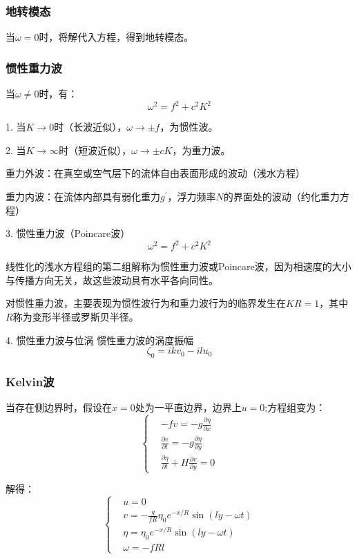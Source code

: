 \documentclass{article}
\begin{document}
\subsubsection{地转模态}
当$\omega=0$时，将解代入方程，得到地转模态。

\subsubsection{惯性重力波}
当$\omega\ne0$时，有：
$$\omega^2 = f^2+c^2K^2$$

1. 当$K \rightarrow 0$时（长波近似），$\omega\rightarrow\pm f$，为惯性波。

2. 当$K \rightarrow \infty$时（短波近似），$\omega\rightarrow\pm cK$，为重力波。

重力外波：在真空或空气层下的流体自由表面形成的波动（浅水方程）

重力内波：在流体内部具有弱化重力$g^{\prime}$，浮力频率$N$的界面处的波动（约化重力方程）

3. 惯性重力波（Poincare波）
$$\omega^2 = f^2+c^2K^2$$

线性化的浅水方程组的第二组解称为惯性重力波或Poincare波，因为相速度的大小与传播方向无关，故这些波动具有水平各向同性。

对惯性重力波，主要表现为惯性波行为和重力波行为的临界发生在$KR=1$，其中$R$称为变形半径或罗斯贝半径。

4. 惯性重力波与位涡
惯性重力波的涡度振幅
$$\zeta_0=ikv_0-ilu_0$$

\subsubsection{Kelvin波}
当存在侧边界时，假设在$x=0$处为一平直边界，边界上$u=0$;方程组变为：
$$\begin{cases}
    &-fv=-g\frac{\partial \eta}{\partial x}\\
    &\frac{\partial v}{\partial t}=-g\frac{\partial \eta}{\partial y}\\
    &\frac{\partial \eta}{\partial t}+H\frac{\partial v}{\partial y} = 0
\end{cases}$$

解得：
$$\begin{cases}
    &u=0\\
    &v=-\frac{g}{fR}\eta_0e^{-x/R}\sin(ly-\omega t)\\
    &\eta = \eta_0e^{-x/R}\sin(ly-\omega t)\\
    &\omega = -fRl
\end{cases}$$
\end{document}
